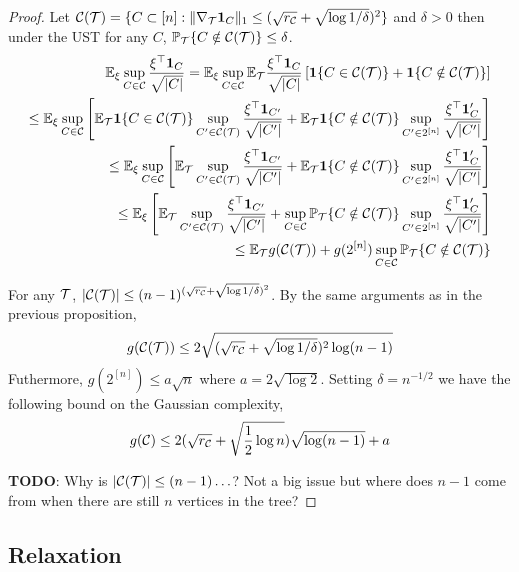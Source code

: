\begin{proof}

Let $\mathcal{C}({\mathcal{T}}) = \{C \subset [n] : \|\nabla_{\mathcal{T}} {\bf 1}_C \|_1 \le (\sqrt{r_{\mathcal{C}}} + \sqrt{\log 1/\delta})^2 \}$ and $\delta > 0$ then under the UST for any $C$, $\mathbb{P}_{\mathcal{T}} \{C \notin \mathcal{C}({\mathcal{T}})\} \le \delta$.
\[
\begin{aligned}
\mathbb{E}_\xi \sup_{C \in \mathcal{C}} \frac{\xi^\top {\bf 1}_C}{\sqrt{|C|}} = \mathbb{E}_\xi \sup_{C \in \mathcal{C}} \mathbb{E}_{\mathcal{T}}  \frac{\xi^\top {\bf 1}_C}{\sqrt{|C|}} \left[ {\bf 1}\{ C \in \mathcal{C}({\mathcal{T}}) \} + {\bf 1}\{ C \notin \mathcal{C}({\mathcal{T}}) \} \right] \\
\le \mathbb{E}_\xi \sup_{C \in \mathcal{C}} \left[ \mathbb{E}_{\mathcal{T}} {\bf 1}\{ C \in \mathcal{C}({\mathcal{T}}) \} \sup_{C' \in \mathcal{C}({\mathcal{T}})}  \frac{\xi^\top {\bf 1}_{C'}}{\sqrt{|C'|}}
+ \mathbb{E}_{\mathcal{T}} {\bf 1}\{ C \notin \mathcal{C}({\mathcal{T}}) \} \sup_{C' \in 2^{[n]}} \frac{\xi^\top {\bf 1}_C'}{\sqrt{|C'|}} \right]\\
\le \mathbb{E}_\xi \sup_{C \in \mathcal{C}} \left[ \mathbb{E}_{\mathcal{T}} \sup_{C' \in \mathcal{C}({\mathcal{T}})}  \frac{\xi^\top {\bf 1}_{C'}}{\sqrt{|C'|}}
+ \mathbb{E}_{\mathcal{T}} {\bf 1}\{ C \notin \mathcal{C}({\mathcal{T}}) \} \sup_{C' \in 2^{[n]}} \frac{\xi^\top {\bf 1}_C'}{\sqrt{|C'|}} \right]\\
\le \mathbb{E}_\xi  \left[ \mathbb{E}_{\mathcal{T}} \sup_{C' \in \mathcal{C}({\mathcal{T}})}  \frac{\xi^\top {\bf 1}_{C'}}{\sqrt{|C'|}}
+ \sup_{C \in \mathcal{C}} \mathbb{P}_{\mathcal{T}} \{ C \notin \mathcal{C}({\mathcal{T}}) \} \sup_{C' \in 2^{[n]}} \frac{\xi^\top {\bf 1}_C'}{\sqrt{|C'|}} \right]\\
\le \mathbb{E}_{\mathcal{T}} g(\mathcal{C}({\mathcal{T}})) + g(2^{[n]}) \sup_{C \in \mathcal{C}} \mathbb{P}_{\mathcal{T}} \{ C \notin \mathcal{C}({\mathcal{T}}) \} 
\end{aligned}
\]

For any ${\mathcal{T}}$, $|\mathcal{C}({\mathcal{T}})| \le (n - 1)^{(\sqrt{r_{\mathcal{C}}} + \sqrt{\log 1/\delta})^2}$.
By the same arguments as in the previous proposition, 
\[
g(\mathcal{C}({\mathcal{T}})) \le 2 \sqrt{(\sqrt{r_{\mathcal{C}}} + \sqrt{\log 1/\delta})^2 \log (n-1)}
\]
Futhermore, $g(2^{[n]}) \le a \sqrt{n}$ where $a = 2 \sqrt{\log 2}$.
Setting $\delta = n^{-1/2}$ we have the following bound on the Gaussian complexity,
\[
g(\mathcal{C}) \le 2 (\sqrt{r_{\mathcal{C}}} + \sqrt{\frac{1}{2} \log n})\sqrt{\log (n-1)} + a
\]

\textbf{TODO}: Why is $|\mathcal{C}({\mathcal{T}})| \le (n-1) \ldots$? Not a big issue but where does $n-1$ come from when there are still $n$ vertices in the tree?

\end{proof}

\subsection{Relaxation}


